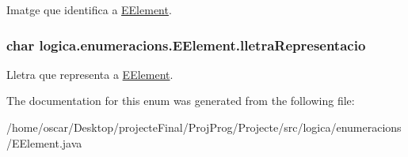Imatge que identifica a \hyperlink{enumlogica_1_1enumeracions_1_1_e_element}{E\+Element}. \hypertarget{enumlogica_1_1enumeracions_1_1_e_element_ada6d33c50cdcf99a08d6bf74c114151d}{
\subsubsection[{lletra\+Representacio}]{\setlength{\rightskip}{0pt plus 5cm}char logica.\+enumeracions.\+E\+Element.\+lletra\+Representacio\hspace{0.3cm}{\ttfamily [private]}}}\label{enumlogica_1_1enumeracions_1_1_e_element_ada6d33c50cdcf99a08d6bf74c114151d}
Lletra que representa a \hyperlink{enumlogica_1_1enumeracions_1_1_e_element}{E\+Element}. 

The documentation for this enum was generated from the following file\+:\begin{DoxyCompactItemize}
\item 
/home/oscar/\+Desktop/projecte\+Final/\+Proj\+Prog/\+Projecte/src/logica/enumeracions/E\+Element.\+java\end{DoxyCompactItemize}
